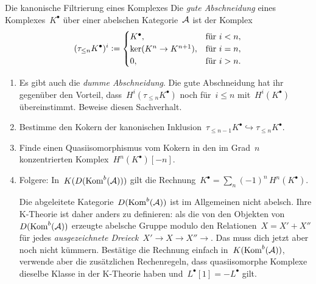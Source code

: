 \documentclass{uebblatt}
\begin{document}
\begin{aufgabe}{Die kanonische Filtrierung eines Komplexes}
Die \emph{gute Abschneidung} eines Komplexes~$K^\bullet$ über einer abelschen
Kategorie~$\mathcal{A}$ ist der Komplex
\[ (\tau_{\leq n} K^\bullet)^i \vcentcolon= \begin{cases}
  K^\bullet, & \text{für $i < n$}, \\
  \ker(K^n \to K^{n+1}), & \text{für $i = n$}, \\
  0, & \text{für $i > n$}.
\end{cases} \]

\begin{enumerate}
\item Es gibt auch die \emph{dumme Abschneidung}. Die gute Abschneidung hat ihr
gegenüber den Vorteil, dass~$H^i(\tau_{\leq n} K^\bullet)$ noch für~$i \leq n$
mit~$H^i(K^\bullet)$ übereinstimmt. Beweise diesen Sachverhalt.
\item Bestimme den Kokern der kanonischen Inklusion~$\tau_{\leq n-1}K^\bullet
\hookrightarrow \tau_{\leq n}K^\bullet$.
\item Finde einen Quasiisomorphismus vom Kokern in den im Grad~$n$
konzentrierten Komplex~$H^n(K^\bullet)[-n]$.
\item Folgere: In~$K(D(\mathrm{Kom}^b(\mathcal{A})))$ gilt die
Rechnung~$K^\bullet = \sum_n (-1)^n\, H^n(K^\bullet)$.

{\scriptsize
Die abgeleitete Kategorie~$D(\mathrm{Kom}^b(\mathcal{A}))$ ist im Allgemeinen nicht abelsch.
Ihre K-Theorie ist daher anders zu definieren: als die von den Objekten
von~$D(\mathrm{Kom}^b(\mathcal{A}))$ erzeugte abelsche Gruppe modulo den Relationen~$X = X' +
X''$ für jedes \emph{ausgezeichnete Dreieck}~$X' \to X \to X'' \to$. Das muss dich
jetzt aber noch nicht kümmern. Bestätige die Rechnung einfach
in~$K(\mathrm{Kom}^b(\mathcal{A}))$, verwende aber die zusätzlichen Rechenregeln, dass
quasiisomorphe Komplexe dieselbe Klasse in der K-Theorie haben
und~$L^\bullet[1] = -L^\bullet$ gilt.
\par}
\end{enumerate}
\end{aufgabe}
\end{document}
